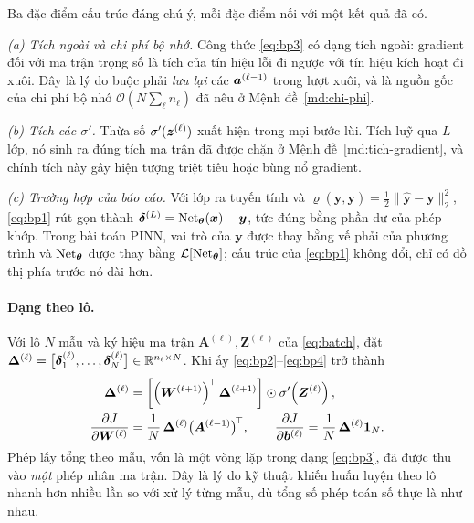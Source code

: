 \begin{nhanxet}
\label{nx:bp-structure}
Ba đặc điểm cấu trúc đáng chú ý, mỗi đặc điểm nối với một kết quả đã có.
 
\emph{(a) Tích ngoài và chi phí bộ nhớ.} Công thức \eqref{eq:bp3} có dạng tích
ngoài: gradient đối với ma trận trọng số là tích của tín hiệu lỗi đi ngược với
tín hiệu kích hoạt đi xuôi. Đây là lý do buộc phải \emph{lưu lại} các
$\bm{a}^{(\ell-1)}$ trong lượt xuôi, và là nguồn gốc của chi phí bộ nhớ
$\mathcal{O}(N\sum_\ell n_\ell)$ đã nêu ở Mệnh đề~\ref{md:chi-phi}.
 
\emph{(b) Tích các $\sigma'$.} Thừa số $\sigma'(\bm{z}^{(\ell)})$ xuất hiện trong
mọi bước lùi. Tích luỹ qua $L$ lớp, nó sinh ra đúng tích ma trận đã được chặn ở
Mệnh đề~\ref{md:tich-gradient}, và chính tích này gây hiện tượng triệt tiêu hoặc
bùng nổ gradient.
 
\emph{(c) Trường hợp của báo cáo.} Với lớp ra tuyến tính và
$\varrho(\hat{\bm y},\bm y) = \tfrac12\|\hat{\bm y}-\bm y\|_2^2$,
\eqref{eq:bp1} rút gọn thành $\bm{\delta}^{(L)} = \operatorname{Net}_{\bm{\theta}}(\bm{x}) - \bm{y}$,
tức đúng bằng phần dư của phép khớp. Trong bài toán PINN, vai trò của
$\bm y$ được thay bằng vế phải của phương trình và $\operatorname{Net}_{\bm{\theta}}$ được thay
bằng $\mathcal{L}[\operatorname{Net}_{\bm{\theta}}]$; cấu trúc của \eqref{eq:bp1} không đổi, chỉ
có đồ thị phía trước nó dài hơn.
\end{nhanxet}
 
\paragraph{Dạng theo lô.} Với lô $N$ mẫu và ký hiệu ma trận
$\bm{A}^{(\ell)}, \bm{Z}^{(\ell)}$ của \eqref{eq:batch}, đặt
$\bm{\Delta}^{(\ell)} = \big[\bm{\delta}^{(\ell)}_1,\dots,
\bm{\delta}^{(\ell)}_N\big] \in \mathbb{R}^{n_\ell\times N}$. Khi ấy
\eqref{eq:bp2}--\eqref{eq:bp4} trở thành
\begin{equation}
\begin{aligned}
\bm{\Delta}^{(\ell)} &= \left[\left(\bm{W}^{(\ell+1)}\right)^{\!\top}
  \bm{\Delta}^{(\ell+1)}\right] \odot \sigma'\!\left(\bm{Z}^{(\ell)}\right),\\
\frac{\partial J}{\partial \bm{W}^{(\ell)}}
 &= \frac{1}{N}\,\bm{\Delta}^{(\ell)}\big(\bm{A}^{(\ell-1)}\big)^{\!\top},
\qquad
\frac{\partial J}{\partial \bm{b}^{(\ell)}}
 = \frac{1}{N}\,\bm{\Delta}^{(\ell)}\bm{1}_N .
\end{aligned}
\label{eq:bp-batch}
\end{equation}
Phép lấy tổng theo mẫu, vốn là một vòng lặp trong dạng \eqref{eq:bp3}, đã được
thu vào \emph{một} phép nhân ma trận. Đây là lý do kỹ thuật khiến huấn luyện theo
lô nhanh hơn nhiều lần so với xử lý từng mẫu, dù tổng số phép toán số thực là như
nhau.
 
